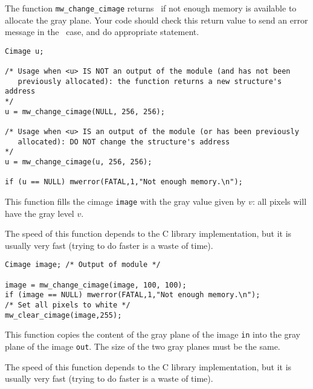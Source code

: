 The function \verb+mw_change_cimage+ returns \Null\ if not enough memory is available to allocate the gray plane. Your code should check this return value to 
send an error message in the \Null\ case, and do appropriate statement.

\Next
\Example
\begin{verbatim}
Cimage u; 

/* Usage when <u> IS NOT an output of the module (and has not been
   previously allocated): the function returns a new structure's address
*/
u = mw_change_cimage(NULL, 256, 256);

/* Usage when <u> IS an output of the module (or has been previously
   allocated): DO NOT change the structure's address
*/
u = mw_change_cimage(u, 256, 256);

if (u == NULL) mwerror(FATAL,1,"Not enough memory.\n");
\end{verbatim}


\newpage %

\Description
This function fills the cimage \verb+image+ with the gray value given by $v$:
all pixels will have the gray level $v$. 

The speed of this function depends to the C library implementation, but it is
usually very fast (trying to do faster is a waste of time).

\Next
\Example
\begin{verbatim}
Cimage image; /* Output of module */

image = mw_change_cimage(image, 100, 100);
if (image == NULL) mwerror(FATAL,1,"Not enough memory.\n");
/* Set all pixels to white */
mw_clear_cimage(image,255);

\end{verbatim}

\newpage %

\Description
This function copies the content of the gray plane of the image \verb+in+ into 
the gray plane of the image \verb+out+.
The size of the two gray planes must be the same.

The speed of this function depends to the C library implementation, but it is
usually very fast (trying to do faster is a waste of time).

